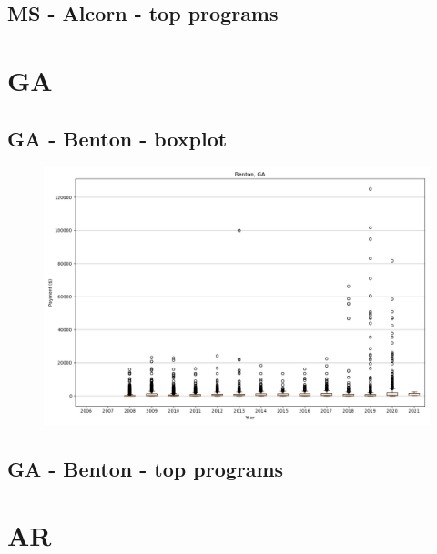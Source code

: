 \subsection*{MS - Alcorn - top programs}

\newpage
\section*{GA}
\subsection*{GA - Benton - boxplot}
\begin{figure}[h]
\centering
\includegraphics[width=7in]{../output/boxplots/counties/Benton-GA_boxplot.png}
\end{figure}


\subsection*{GA - Benton - top programs}

\newpage
\section*{AR}
